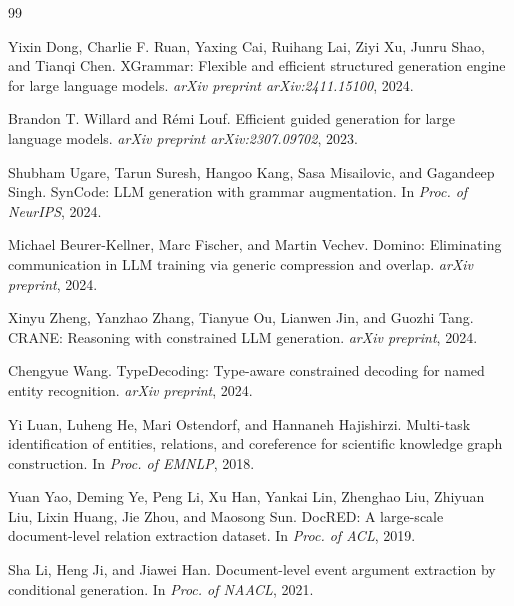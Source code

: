 \documentclass[11pt]{article}
\begin{document}

\begin{thebibliography}{99}

Yixin Dong, Charlie F. Ruan, Yaxing Cai, Ruihang Lai, Ziyi Xu, Junru Shao, and Tianqi Chen.
\newblock XGrammar: Flexible and efficient structured generation engine for large language models.
\newblock \emph{arXiv preprint arXiv:2411.15100}, 2024.

Brandon T. Willard and R\'emi Louf.
\newblock Efficient guided generation for large language models.
\newblock \emph{arXiv preprint arXiv:2307.09702}, 2023.

Shubham Ugare, Tarun Suresh, Hangoo Kang, Sasa Misailovic, and Gagandeep Singh.
\newblock SynCode: LLM generation with grammar augmentation.
\newblock In \emph{Proc. of NeurIPS}, 2024.

Michael Beurer-Kellner, Marc Fischer, and Martin Vechev.
\newblock Domino: Eliminating communication in LLM training via generic compression and overlap.
\newblock \emph{arXiv preprint}, 2024.

Xinyu Zheng, Yanzhao Zhang, Tianyue Ou, Lianwen Jin, and Guozhi Tang.
\newblock CRANE: Reasoning with constrained LLM generation.
\newblock \emph{arXiv preprint}, 2024.

Chengyue Wang.
\newblock TypeDecoding: Type-aware constrained decoding for named entity recognition.
\newblock \emph{arXiv preprint}, 2024.

Yi Luan, Luheng He, Mari Ostendorf, and Hannaneh Hajishirzi.
\newblock Multi-task identification of entities, relations, and coreference for scientific knowledge graph construction.
\newblock In \emph{Proc. of EMNLP}, 2018.

Yuan Yao, Deming Ye, Peng Li, Xu Han, Yankai Lin, Zhenghao Liu, Zhiyuan Liu, Lixin Huang, Jie Zhou, and Maosong Sun.
\newblock DocRED: A large-scale document-level relation extraction dataset.
\newblock In \emph{Proc. of ACL}, 2019.

Sha Li, Heng Ji, and Jiawei Han.
\newblock Document-level event argument extraction by conditional generation.
\newblock In \emph{Proc. of NAACL}, 2021.


\end{thebibliography}
\end{document}

